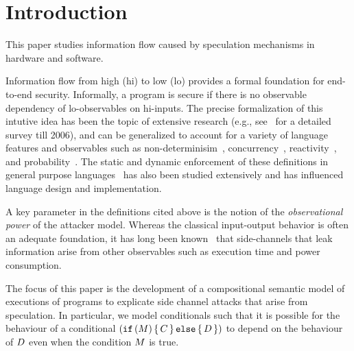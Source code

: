 \section{Introduction}

This paper studies information flow caused by speculation mechanisms
in hardware and software.

Information flow from high (hi) to low (lo) provides a formal
foundation for end-to-end security.  Informally, a program is secure
if there is no observable dependency of lo-observables on hi-inputs.
The precise formalization of this intutive idea has been the topic of
extensive research (e.g., see~\cite{Sabelfeld:2006:LIS:2312191.2314769}  for a detailed survey till
2006), and can be generalized to account for a variety of language
features and observables such as non-determinisim~\cite{Wittbold1990InformationFI},
concurrency~\cite{Smith:1998:SIF:268946.268975}, reactivity~\cite{O'Neill:2006:ISI:1155442.1155677}, and
probability~\cite{Gray:1992:TMF:2699806.2699811}. The static and dynamic enforcement
of these definitions in general purpose languages~\cite{myers-popl99} has also
been studied extensively and has influenced language design and
implementation.

A key parameter in the definitions cited above is the notion of
the \emph{observational power} of the attacker model. Whereas the classical
input-output behavior is often an adequate foundation,
it has long been known~\cite{???} that side-channels that leak
information arise from other observables such as execution time and
power consumption.

The focus of this paper is the development of a compositional semantic model of
executions of programs to explicate side channel attacks that arise
from speculation. In particular, we model conditionals such that it is
possible for the behaviour of a conditional
$(\texttt{if}\,(M)\,\{\, C \,\}\,\texttt{else}\,\{\, D \,\})$ to depend on the behaviour
of $D$ even when the condition $M$ is true.


